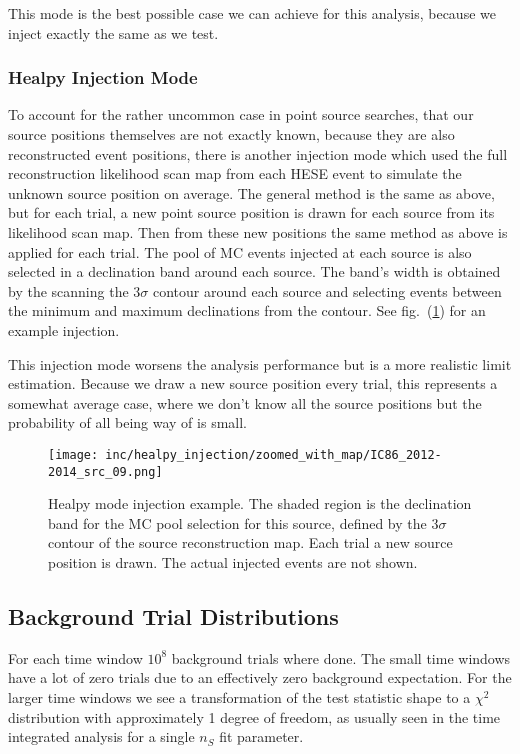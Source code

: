 This mode is the best possible case we can achieve for this analysis, because we inject exactly the same as we test.

\subsubsection*{Healpy Injection Mode}
To account for the rather uncommon case in point source searches, that our source positions themselves are not exactly known, because they are also reconstructed event positions, there is another injection mode which used the full reconstruction likelihood scan map from each HESE event to simulate the unknown source position on average.
The general method is the same as above, but for each trial, a new point source position is drawn for each source from its likelihood scan map.
Then from these new positions the same method as above is applied for each trial.
The pool of MC events injected at each source is also selected in a declination band around each source.
The band's width is obtained by the scanning the $3\sigma$ contour around each source and selecting events between the minimum and maximum declinations from the contour.
See fig.~(\ref{fig:healpy_injection}) for an example injection.

This injection mode worsens the analysis performance but is a more realistic limit estimation.
Because we draw a new source position every trial, this represents a somewhat average case, where we don't know all the source positions but the probability of all being way of is small.
\begin{figure}[htbp]
  \centering
  \texttt{[image: inc/healpy\_injection/zoomed\_with\_map/IC86\_2012-2014\_src\_09.png]}
  \caption{Healpy mode injection example. The shaded region is the declination band for the MC pool selection for this source, defined by the $3\sigma$ contour of the source reconstruction map. Each trial a new source position is drawn. The actual injected events are not shown.}
  \label{fig:healpy_injection}
\end{figure}

\subsection{Background Trial Distributions}
For each time window $10^8$ background trials where done.
The small time windows have a lot of zero trials due to an effectively zero background expectation.
For the larger time windows we see a transformation of the test statistic shape to a $\chi^2$ distribution with approximately 1 degree of freedom, as usually seen in the time integrated analysis for a single $n_S$ fit parameter.

